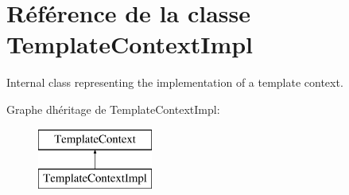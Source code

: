 \hypertarget{class_template_context_impl}{}\section{Référence de la classe Template\+Context\+Impl}
\label{class_template_context_impl}


Internal class representing the implementation of a template context.  


Graphe d\textquotesingle{}héritage de Template\+Context\+Impl\+:\begin{figure}[H]
\begin{center}
\leavevmode
\includegraphics[height=2.000000cm]{class_template_context_impl}
\end{center}
\end{figure}
